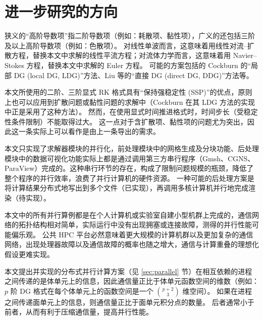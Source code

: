 \section*{进一步研究的方向}
\begin{description}[wide]
\item[增加对高阶导数项的支持。]
狭义的“高阶导数项”指二阶导数项（例如：耗散项、黏性项），广义的还包括三阶及以上高阶导数项（例如：色散项）。
对线性单波而言，这意味着用线性对流–扩散方程，替换本文中求解的线性平流方程；对流体力学而言，这意味着用
Navier–Stokes 方程，替换本文中求解的 Euler 方程。 
可能的方案包括的 Cockburn 的“局部 DG (local DG, LDG)”方法、Liu 等的“直接 DG (direct DG, DDG)”方法等。
\item[提供对隐式时间推进格式的支持。]
本文所使用的二阶、三阶显式 RK 格式具有“保持强稳定性 (SSP)”的优点，原则上也可以应用到扩散问题或黏性问题的求解中（Cockburn 在其 LDG 方法的实现中正是采用了这种方法）。
然而，在使用显式时间推进格式时，时间步长（受稳定性条件限制）不能取得过大。
这一点对于含扩散项、黏性项的问题尤为突出，因此这一条实际上可以看作是由上一条导出的需求。
\item[提高前/后处理模块的并行化程度。]
本文只实现了求解器模块的并行化，前处理模块中的网格生成及分块功能、后处理模块中的数据可视化功能实际上都是通过调用第三方串行程序（Gmsh、CGNS、ParaView）完成的。这种串行环节的存在，构成了限制问题规模的瓶颈，降低了整个程序的并行效率，浪费了并行计算机的硬件资源。
一种可能的后处理方案是将计算结果分布式地写出到多个文件（已实现），再调用多核计算机并行地完成渲染（待实现）。
\item[在公共高性能计算平台上测试并行性能。]
本文中的所有并行算例都是在个人计算机或实验室自建小型机群上完成的，通信网络的拓扑结构相对简单，实际运行中没有出现拥塞或连接故障，测得的并行性能可能偏乐观。
公共 HPC 平台必然意味着更大规模的计算机群以及更加复杂的通信网络，出现处理器故障以及通信故障的概率也随之增大，通信与计算重叠的理想化假设更难实现。
\item[尝试传递面单元（而非体单元）上的信息。]
本文提出并实现的分布式并行计算方案（见 \ref{sec:parallel} 节）在相互依赖的进程之间传递的是体单元上的信息，因此通信量正比于体单元函数空间的维数（例如：$p$ 阶 DG 格式在每个体单元上的函数空间是一个 $\binom{p+2}{3}$ 维空间）。
如果在进程之间传递面单元上的信息，则通信量正比于面单元积分点的数量。
后者通常小于前者，从而有利于压缩通信量，提高并行性能。
\end{description}
